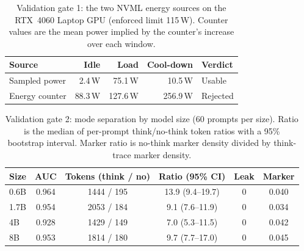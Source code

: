 \documentclass[11pt]{article}
\begin{document}
\begin{table}[ht]
\centering
\caption{Validation gate 1: the two NVML energy sources on the RTX~4060
Laptop GPU (enforced limit 115\,W). Counter values are the mean power implied
by the counter's increase over each window.}
\label{tab:gate1}
\renewcommand{\arraystretch}{1.1}
\begin{tabular}{@{}lrrrl@{}}
\toprule
Source & Idle & Load & Cool-down & Verdict \\
\midrule
Sampled power & 2.4\,W & 75.1\,W & 10.5\,W & Usable \\
Energy counter & 88.3\,W & 127.6\,W & 256.9\,W & Rejected \\
\bottomrule
\end{tabular}
\end{table}

\begin{table}[ht]
\centering
\caption{Validation gate 2: mode separation by model size (60 prompts per
size). Ratio is the median of per-prompt think/no-think token ratios with a
95\% bootstrap interval. Marker ratio is no-think marker density divided by
think-trace marker density.}
\label{tab:gate2}
\renewcommand{\arraystretch}{1.1}
\setlength{\tabcolsep}{5pt}
\begin{tabular}{@{}lccccc@{}}
\toprule
Size & AUC & Tokens (think / no) & Ratio (95\% CI) & Leak & Marker \\
\midrule
0.6B & 0.964 & 1444 / 195 & 13.9 (9.4--19.7) & 0 & 0.040 \\
1.7B & 0.954 & 2053 / 184 & 9.1 (7.6--11.9)  & 0 & 0.034 \\
4B   & 0.928 & 1429 / 149 & 7.0 (5.3--11.5)  & 0 & 0.042 \\
8B   & 0.953 & 1814 / 180 & 9.7 (7.7--17.0)  & 0 & 0.045 \\
\bottomrule
\end{tabular}
\end{table}

\begin{table}[ht]
\centering
\small
\caption{Router overhead per decision, averaged over seeds and both training
objectives. CPU energy is an upper bound, decision time multiplied by
54\,W; GPU energy is metered. The LoRA router is charged the zero-shot
probe's cost. Cascade figures are per verification check, and a query may
need several.}
\label{tab:overhead}

\end{table}

\begin{table}[ht]
\centering
\small
\caption{Carbon of the escalation tax under oracle detection, in grams of
CO$_2$e per 1{,}000 queries. Total kWh is the policy's own energy for those
queries and Tax kWh the energy of its tax alone; each carbon figure is Tax
kWh multiplied by the grid intensity beside it. The four intensity columns
are in gCO$_2$e/kWh: 50 for a grid carried by nuclear or hydro, 250 for a
large renewable share, 475 for the figure usually quoted as the global
average, and 700 for a grid carried by coal. They are round values spanning
the range grids occupy, not measurements of a named region.}
\label{tab:carbon}

\end{table}
\end{document}
